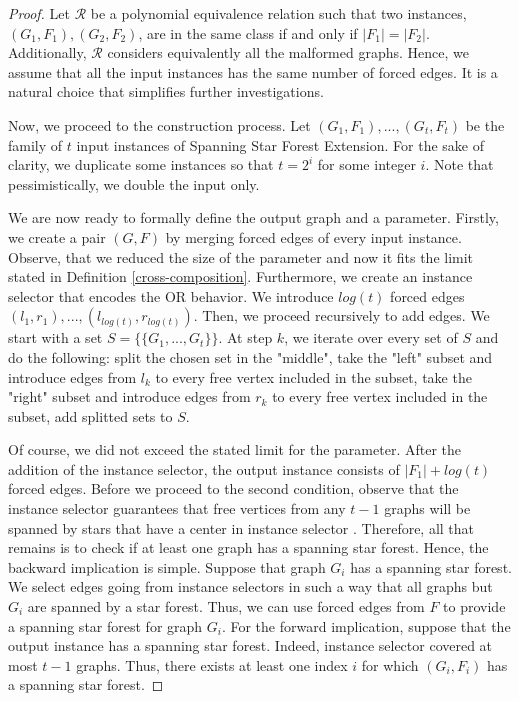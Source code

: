 \documentclass[en]{pracamgr}
\newcommand{\ssfep}{{\sc Spanning Star Forest Extension}}
\begin{document}
\begin{proof}
	Let $\mathcal{R}$ be a polynomial equivalence relation such that two instances, $(G_1,F_1),(G_2, F_2)$, are in the same class if and only if $|F_1| = |F_2|$. Additionally, $\mathcal{R}$ considers equivalently all the malformed graphs. Hence, we assume that all the input instances has the same number of forced edges. It is a natural choice that simplifies further investigations.
	
	Now, we proceed to the construction process. Let $(G_1,F_1),...,(G_t,F_t)$ be the family of $t$ input instances of \ssfep{}. For the sake of clarity, we duplicate some instances so that $t = 2^i$ for some integer $i$. Note that pessimistically, we double the input only.
	
	We are now ready to formally define the output graph and a parameter. Firstly, we create a pair $(G,F)$ by merging forced edges of every input instance. Observe, that we reduced the size of the parameter and now it fits the limit stated in Definition \ref{cross-composition}. Furthermore, we create an instance selector that encodes the OR behavior. We introduce $log(t)$ forced edges $(l_1,r_1),...,(l_{log(t)},r_{log(t)})$. Then, we proceed recursively to add edges. We start with a set $S=\{\{G_1,...,G_t\}\}$. At step $k$, we iterate over every set of $S$ and do the following: split the chosen set in the "middle", take the "left" subset and introduce edges from $l_k$ to every free vertex included in the subset, take the "right" subset and introduce edges from $r_k$ to every free vertex included in the subset, add splitted sets to $S$.
	
	Of course, we did not exceed the stated limit for the parameter. After the addition of the instance selector, the output instance consists of $|F_1|+log(t)$ forced edges. Before we proceed to the second condition, observe that the instance selector guarantees that free vertices from any $t-1$ graphs will be spanned by stars that have a center in instance selector . Therefore, all that remains is to check if at least one graph has a spanning star forest. Hence, the backward implication is simple. Suppose that graph $G_i$ has a spanning star forest. We select edges going from instance selectors in such a way that all graphs but $G_i$ are spanned by a star forest. Thus, we can use forced edges from $F$ to provide a spanning star forest for graph $G_i$. For the forward implication, suppose that the output instance has a spanning star forest. Indeed, instance selector covered at most $t-1$ graphs. Thus, there exists at least one index $i$ for which $(G_i,F_i)$ has a spanning star forest.
\end{proof}
\end{document}
